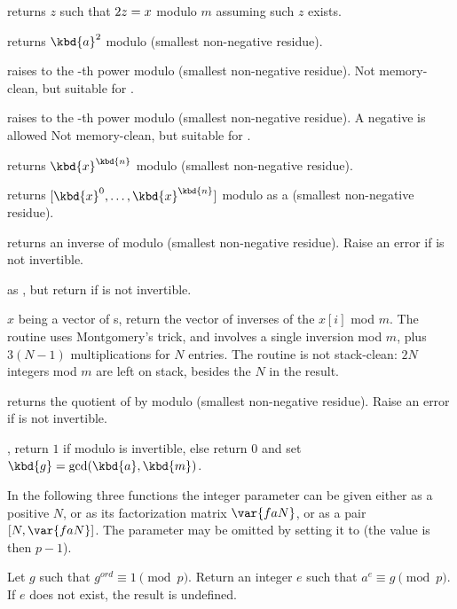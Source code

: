  returns $z$ such that $2\*z = x$ modulo
$m$ assuming such $z$ exists.

 returns $\kbd{a}^2$ modulo  (smallest
non-negative residue).

 raises  to the -th
power modulo  (smallest non-negative residue). Not memory-clean, but
suitable for .

 raises  to the -th
power modulo  (smallest non-negative residue). A negative  is
allowed Not memory-clean, but suitable for .

 returns $\kbd{x}^\kbd{n}$
modulo  (smallest non-negative residue).

 returns
$[\kbd{x}^0, \dots, \kbd{x}^\kbd{n}]$ modulo  as a 
 (smallest non-negative residue).

 returns an inverse of  modulo 
(smallest non-negative residue). Raise an error if  is not invertible.

 as , but return
 if  is not invertible.

 $x$ being a vector of s, return
the vector of inverses of the $x[i]$ mod $m$. The routine uses Montgomery's
trick, and involves a single inversion mod $m$, plus $3(N-1)$ multiplications
for $N$ entries. The routine is not stack-clean: $2N$ integers mod $m$
are left on stack, besides the $N$ in the result.

 returns the quotient of  by
 modulo  (smallest non-negative residue). Raise an error if
 is not invertible.

,  return $1$ if 
modulo  is invertible, else return $0$ and set
$\kbd{g} = \gcd(\kbd{a},\kbd{m})$.

In the following three functions the integer parameter  can be given
either as a positive  $N$, or as its factorization matrix $\var{faN}$,
 or as a pair $[N,\var{faN}]$. The parameter may be omitted by setting it to
 (the value is then $p-1$).

 Let $g$ such that
$g^{ord} \equiv 1 \pmod{p}$. Return an integer $e$ such that
$a^e \equiv g \pmod{p}$. If $e$ does not exist, the result is undefined.

